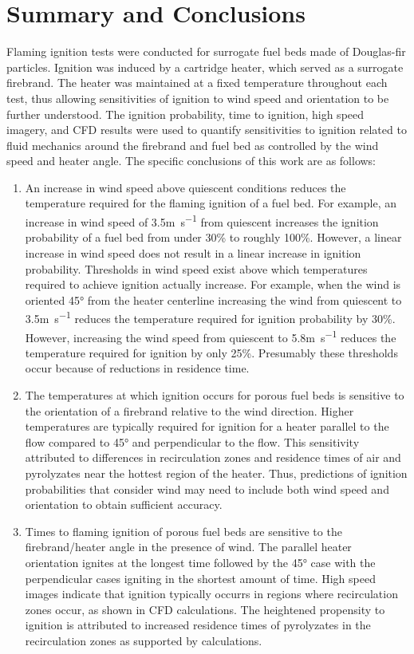\section{Summary and Conclusions}
\label{sec:summary2}
    Flaming ignition tests were conducted for surrogate fuel beds made of Douglas-fir particles.
    Ignition was induced by a cartridge heater, which served as a surrogate firebrand. The heater was maintained at a fixed temperature throughout each test, thus allowing sensitivities of ignition to wind speed and orientation to be further understood. The ignition probability, time to ignition, high speed imagery, and CFD results were used to quantify sensitivities to ignition related to fluid mechanics around the firebrand and fuel bed as controlled by the wind speed and heater angle. The specific conclusions of this work are as follows:
        \begin{enumerate}
            \item
            An increase in wind speed above quiescent conditions reduces the temperature required for the flaming ignition of a fuel bed. For example, an increase in wind speed of 3.5\si{\meter\per\second} from quiescent increases the ignition probability of a fuel bed from under 30\% to roughly 100\%. However, a linear increase in wind speed does not result in a linear increase in ignition probability. Thresholds in wind speed exist above which temperatures required to achieve ignition actually increase. For example, when the wind is oriented 45\si{\degree} from the heater centerline increasing the wind from quiescent to 3.5\si{\meter\per\second} reduces the temperature required for ignition probability by 30\%. However, increasing the wind speed from quiescent to 5.8\si{\meter\per\second} reduces the temperature required for ignition by only 25\%. Presumably these thresholds occur because of reductions in residence time. 
            
            \item The temperatures at which ignition occurs for porous fuel beds is sensitive to the orientation of a firebrand relative to the wind direction. Higher temperatures are typically required for ignition for a heater parallel to the flow compared to 45\si{\degree} and perpendicular to the flow. This sensitivity attributed to differences in recirculation zones and residence times of air and pyrolyzates near the hottest region of the heater. Thus, predictions of ignition probabilities that consider wind may need to include both wind speed and orientation to obtain sufficient accuracy.
            
            \item Times to flaming ignition of porous fuel beds are sensitive to the firebrand/heater angle in the presence of wind.
            The parallel heater orientation ignites at the longest time followed by the 45\si{\degree} case with the perpendicular cases igniting in the shortest amount of time. High speed images indicate that ignition typically occurrs in regions where recirculation zones occur, as shown in CFD calculations. The heightened propensity to ignition is attributed to increased residence times of pyrolyzates in the recirculation zones as supported by calculations.
        \end{enumerate}
